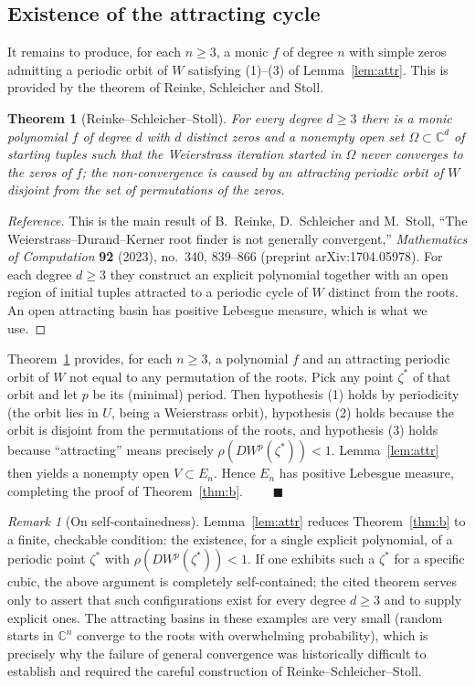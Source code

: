 \documentclass{amsart}
\newtheorem{theorem}{Theorem}
\theoremstyle{definition}
\theoremstyle{remark}
\newtheorem{remark}{Remark}
\newcommand{\C}{\mathbb{C}}
\begin{document}
\subsection{Existence of the attracting cycle}

It remains to produce, for each $n\ge3$, a monic $f$ of degree $n$ with simple zeros
admitting a periodic orbit of $W$ satisfying (1)--(3) of Lemma~\ref{lem:attr}. This is
provided by the theorem of Reinke, Schleicher and Stoll.

\begin{theorem}[Reinke--Schleicher--Stoll]\label{thm:rss}
For every degree $d\ge3$ there is a monic polynomial $f$ of degree $d$ with $d$ distinct
zeros and a nonempty open set $\Omega\subset\C^{d}$ of starting tuples such that the
Weierstrass iteration started in $\Omega$ never converges to the zeros of $f$; the
non-convergence is caused by an attracting periodic orbit of $W$ disjoint from the set of
permutations of the zeros.
\end{theorem}

\begin{proof}[Reference]
This is the main result of B.~Reinke, D.~Schleicher and M.~Stoll, ``The
Weierstrass--Durand--Kerner root finder is not generally convergent,'' \emph{Mathematics of
Computation} \textbf{92} (2023), no.\ 340, 839--866 (preprint arXiv:1704.05978). For each
degree $d\ge3$ they construct an explicit polynomial together with an open region of initial
tuples attracted to a periodic cycle of $W$ distinct from the roots. An open attracting basin
has positive Lebesgue measure, which is what we use.
\end{proof}

Theorem~\ref{thm:rss} provides, for each $n\ge3$, a polynomial $f$ and an attracting periodic
orbit of $W$ not equal to any permutation of the roots. Pick any point $\zeta^{*}$ of that
orbit and let $p$ be its (minimal) period. Then hypothesis (1) holds by periodicity (the
orbit lies in $U$, being a Weierstrass orbit), hypothesis (2) holds because the orbit is
disjoint from the permutations of the roots, and hypothesis (3) holds because
``attracting'' means precisely $\rho(DW^{p}(\zeta^{*}))<1$. Lemma~\ref{lem:attr} then yields
a nonempty open $V\subset E_n$. Hence $E_n$ has positive Lebesgue measure, completing the
proof of Theorem~\ref{thm:b}. $\qquad\blacksquare$

\begin{remark}[On self-containedness]
Lemma~\ref{lem:attr} reduces Theorem~\ref{thm:b} to a finite, checkable condition: the
existence, for a single explicit polynomial, of a periodic point $\zeta^{*}$ with
$\rho(DW^{p}(\zeta^{*}))<1$. If one exhibits such a $\zeta^{*}$ for a specific cubic, the
above argument is completely self-contained; the cited theorem serves only to assert that such
configurations exist for every degree $d\ge3$ and to supply explicit ones. The attracting
basins in these examples are very small (random starts in $\C^{n}$ converge to the roots with
overwhelming probability), which is precisely why the failure of general convergence was
historically difficult to establish and required the careful construction of
Reinke--Schleicher--Stoll.
\end{remark}
\end{document}
